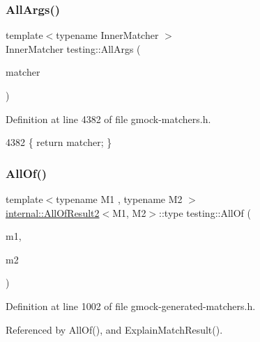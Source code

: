 \subsubsection{\texorpdfstring{All\+Args()}{AllArgs()}}
{\footnotesize\ttfamily template$<$typename Inner\+Matcher $>$ \\
Inner\+Matcher testing\+::\+All\+Args (\begin{DoxyParamCaption}\item[{const Inner\+Matcher \&}]{matcher }\end{DoxyParamCaption})\hspace{0.3cm}{\ttfamily [inline]}}



Definition at line 4382 of file gmock-\/matchers.\+h.


\begin{DoxyCode}
4382 \{ \textcolor{keywordflow}{return} matcher; \}
\end{DoxyCode}
\mbox{\label{namespacetesting_af7618e8606c1cb45738163688944e2b7}} 
\subsubsection{\texorpdfstring{All\+Of()}{AllOf()}\hspace{0.1cm}{\footnotesize\ttfamily [1/9]}}
{\footnotesize\ttfamily template$<$typename M1 , typename M2 $>$ \\
\hyperlink{structtesting_1_1internal_1_1AllOfResult2}{internal\+::\+All\+Of\+Result2}$<$M1, M2$>$\+::type testing\+::\+All\+Of (\begin{DoxyParamCaption}\item[{M1}]{m1,  }\item[{M2}]{m2 }\end{DoxyParamCaption})\hspace{0.3cm}{\ttfamily [inline]}}



Definition at line 1002 of file gmock-\/generated-\/matchers.\+h.



Referenced by All\+Of(), and Explain\+Match\+Result().


